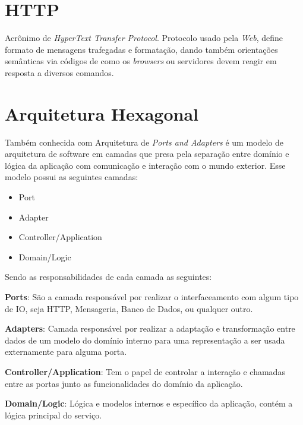 	\section{HTTP} %
	Acrônimo de \textit{HyperText Transfer Protocol}. Protocolo usado pela \textit{Web}, define formato de mensagens trafegadas e formatação, dando também orientações semânticas via códigos\cite{httpcodes} de como os \textit{browsers} ou servidores devem reagir em resposta a diversos comandos.
	
	\section{Arquitetura Hexagonal}
	
	Também conhecida com Arquitetura de \textit{Ports and Adapters} é um modelo de arquitetura de software em camadas que presa pela separação entre domínio e lógica da aplicação com comunicação e interação com o mundo exterior. Esse modelo possui as seguintes camadas:
	
	\begin{itemize}
	    \item Port
	    \item Adapter
	    \item Controller/Application
	    \item Domain/Logic
	\end{itemize}
	
	Sendo as responsabilidades de cada camada as seguintes:
	
	\textbf{Ports}: São a camada responsável por realizar o interfaceamento com algum tipo de IO, seja HTTP, Mensageria, Banco de Dados, ou qualquer outro.
	
	\textbf{Adapters}: Camada responsável por realizar a adaptação e transformação entre dados de um modelo do domínio interno para uma representação a ser usada externamente para alguma porta.
	
	\textbf{Controller/Application}: Tem o papel de controlar a interação e chamadas entre as portas junto as funcionalidades do domínio da aplicação.
	
	\textbf{Domain/Logic}: Lógica e modelos internos e específico da aplicação, contém a lógica principal do serviço.
	
